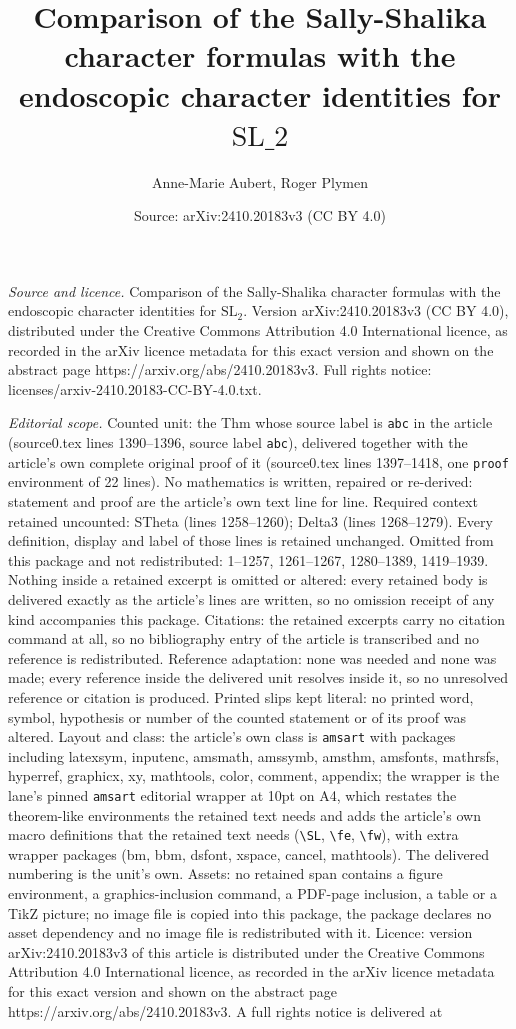 \documentclass[10pt,a4paper]{amsart}
\title[Comparison of the Sally-Shalika character formulas with the ]{Comparison of the Sally-Shalika character formulas with the endoscopic character identities for $\mathrm{SL}\_2$}
\author{Anne-Marie Aubert, Roger Plymen}
\date{Source: arXiv:2410.20183v3 (CC BY 4.0)}
\begin{document}
\maketitle

\noindent\emph{Source and licence.} Comparison of the Sally-Shalika character formulas with the endoscopic character identities for $\mathrm{SL}_2$. Version arXiv:2410.20183v3 (CC BY 4.0), distributed under the Creative Commons Attribution 4.0 International licence, as recorded in the arXiv licence metadata for this exact version and shown on the abstract page https://arxiv.org/abs/2410.20183v3. Full rights notice: licenses/arxiv-2410.20183-CC-BY-4.0.txt.\par\smallskip

\noindent\textit{Editorial scope.} Counted unit: the Thm whose source label is \texttt{abc} in the article (source0.tex lines 1390--1396, source label \texttt{abc}), delivered together with the article's own complete original proof of it (source0.tex lines 1397--1418, one \texttt{proof} environment of 22 lines). No mathematics is written, repaired or re-derived: statement and proof are the article's own text line for line. Required context retained uncounted: STheta (lines 1258--1260); Delta3 (lines 1268--1279). Every definition, display and label of those lines is retained unchanged. Omitted from this package and not redistributed: 1--1257, 1261--1267, 1280--1389, 1419--1939. Nothing inside a retained excerpt is omitted or altered: every retained body is delivered exactly as the article's lines are written, so no omission receipt of any kind accompanies this package. Citations: the retained excerpts carry no citation command at all, so no bibliography entry of the article is transcribed and no reference is redistributed. Reference adaptation: none was needed and none was made; every reference inside the delivered unit resolves inside it, so no unresolved reference or citation is produced. Printed slips kept literal: no printed word, symbol, hypothesis or number of the counted statement or of its proof was altered. Layout and class: the article's own class is \texttt{amsart} with packages including latexsym, inputenc, amsmath, amssymb, amsthm, amsfonts, mathrsfs, hyperref, graphicx, xy, mathtools, color, comment, appendix; the wrapper is the lane's pinned \texttt{amsart} editorial wrapper at 10pt on A4, which restates the theorem-like environments the retained text needs and adds the article's own macro definitions that the retained text needs (\texttt{\textbackslash SL}, \texttt{\textbackslash fe}, \texttt{\textbackslash fw}), with extra wrapper packages (bm, bbm, dsfont, xspace, cancel, mathtools). The delivered numbering is the unit's own. Assets: no retained span contains a figure environment, a graphics-inclusion command, a PDF-page inclusion, a table or a TikZ picture; no image file is copied into this package, the package declares no asset dependency and no image file is redistributed with it. Licence: version arXiv:2410.20183v3 of this article is distributed under the Creative Commons Attribution 4.0 International licence, as recorded in the arXiv licence metadata for this exact version and shown on the abstract page https://arxiv.org/abs/2410.20183v3. A full rights notice is delivered at 
\end{document}
